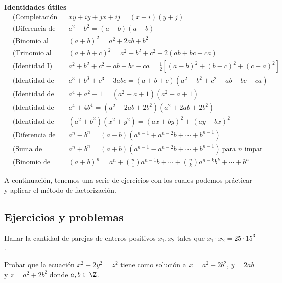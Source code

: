\textbf{Identidades útiles}
\begin{align*}
    &\text{(Completación de rectángulo)} && xy + iy + jx + ij = (x + i)(y + j)\\[2mm]
    &\text{(Diferencia de cuadrados)} && a^2 - b^2 = (a - b)(a + b)\\[2mm]
    &\text{(Binomio al cuadrado)} && (a + b)^2 = a^2 + 2ab + b^2\\[2mm]
    &\text{(Trinomio al cuadrado)} && (a + b + c)^2 = a^2 + b^2 + c^2 + 2(ab + bc + ca)\\[1.5mm]
    &\text{(Identidad I)} && a^2 + b^2 + c^2 - ab - bc - ca = \frac{1}{2}\left[ (a - b)^2 + (b - c)^2 + (c - a)^2 \right]\\[1.5mm]
    &\text{(Identidad de Gauss)} && a^3 + b^3 + c^3 - 3abc = (a + b + c)(a^2 + b^2 + c^2 - ab - bc - ca)\\[2mm]
    &\text{(Identidad de Argand)} && a^4 + a^2 + 1 = (a^2 - a + 1)(a^2 + a + 1)\\[2mm]
    &\text{(Identidad de Sophie Germain)} && a^4 + 4 b^4 = (a^2 - 2ab + 2b^2)\left(a^2 + 2ab + 2b^2\right)\\[2mm]
    &\text{(Identidad de Brahmagupta)} && (a^2 + b^2) (x^2 + y^2) = (ax + by)^2 + (ay - bx)^2\\[2mm]
    &\text{(Diferencia de potencias)} && a^n - b^n = (a - b)(a^{n - 1} + a^{n - 2}b + \cdots + b^{n - 1})\\[2mm]
    &\text{(Suma de potencias)} && a^n + b^n = (a + b)(a^{n - 1} - a^{n - 2}b + \cdots + b^{n - 1}) \ \text{para $n$ impar}\\[1.5mm]
    &\text{(Binomio de Newton)} && (a + b)^n = a^n + \binom{n}{1} a^{n - 1}b + \cdots + \binom{n}{k} a^{n -k}b^k + \cdots + b^n
\end{align*}

A continuación, tenemos una serie de ejercicios con los cuales podemos prácticar y aplicar el método de factorización.


\subsection{Ejercicios y problemas}

\begin{exercise}
    Hallar la cantidad de parejas de enteros positivos $x_1, x_2$ tales que $x_1 \cdot x_2 = 25 \cdot 15^3$.
\end{exercise}

\begin{exercise}
    Probar que la ecuación $x^2 + 2y^2 = z^2$ tiene como solución a $x = a^2 - 2b^2$, $y = 2ab$ y $z = a^2 + 2b^2$ donde $a, b \in \Z$.
\end{exercise}

